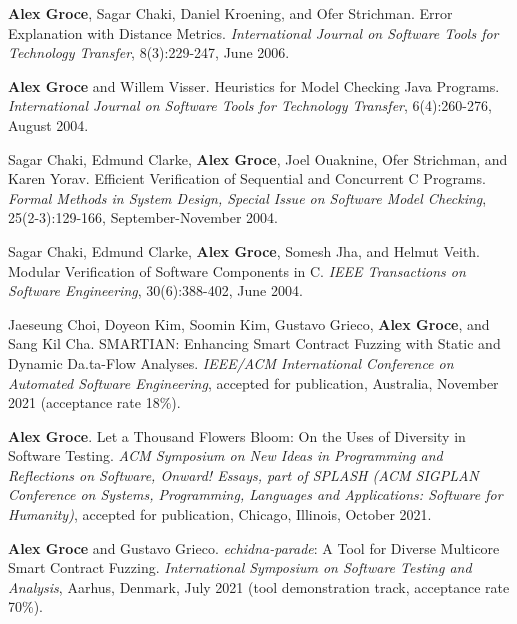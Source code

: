 \documentclass[ComputerScience]{vita}
\begin{document}
\begin{vita}
\begin{Refereed Journal Publications}
\item
{\bf Alex Groce}, Sagar Chaki, Daniel Kroening, and Ofer Strichman.
\newblock Error Explanation with Distance Metrics.
\newblock \emph{International Journal on Software Tools for Technology Transfer}, 8(3):229-247, June 2006.

\item
{\bf Alex Groce} and Willem Visser.
\newblock Heuristics for Model Checking Java Programs.
\newblock \emph{International Journal on Software Tools for Technology Transfer}, 6(4):260-276, August 2004.


\item
Sagar Chaki, Edmund Clarke, {\bf Alex Groce}, Joel Ouaknine, Ofer Strichman, and Karen Yorav.
\newblock Efficient Verification of Sequential and Concurrent C Programs.
\newblock \emph{Formal Methods in System Design, Special Issue on Software Model Checking}, 25(2-3):129-166, September-November 2004.

\item
Sagar Chaki, Edmund Clarke, {\bf Alex Groce}, Somesh Jha, and Helmut Veith.
\newblock Modular Verification of Software Components in C.
\newblock \emph{IEEE Transactions on Software Engineering}, 30(6):388-402, June 2004.

\end{Refereed Journal Publications}

\begin{Refereed Conference and Workshop Publications}

\item Jaeseung Choi, Doyeon Kim, Soomin Kim, Gustavo Grieco, {\bf Alex Groce}, and Sang Kil Cha.
\newblock SMARTIAN: Enhancing Smart Contract Fuzzing with Static and Dynamic Da.ta-Flow Analyses.
\newblock \emph{IEEE/ACM International Conference on Automated Software
  Engineering}, accepted for publication, Australia, November 2021 (acceptance rate 18\%).

\item
{\bf Alex Groce}.
\newblock Let a Thousand Flowers Bloom: On the Uses of Diversity in Software Testing.
\newblock \emph{ACM Symposium on New Ideas in Programming and Reflections on Software, Onward! Essays, part of SPLASH (ACM SIGPLAN Conference on Systems, Programming, Languages and Applications: Software for Humanity)}, accepted for publication, Chicago, Illinois, October 2021.

\item {\bf Alex Groce} and Gustavo Grieco.
  \newblock \emph{echidna-parade}: A Tool for Diverse Multicore Smart Contract Fuzzing.
  \newblock \emph{International Symposium on Software Testing and
  Analysis}, Aarhus, Denmark, July
2021 (tool demonstration track, acceptance rate 70\%).
  

\end{Refereed Conference and Workshop Publications}
\end{vita}
\end{document}
